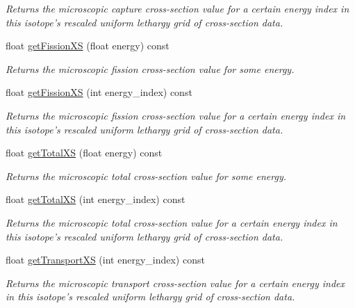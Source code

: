 \begin{DoxyCompactItemize}
\begin{DoxyCompactList}\small\item\em Returns the microscopic capture cross-\/section value for a certain energy index in this isotope's rescaled uniform lethargy grid of cross-\/section data. \end{DoxyCompactList}\item 
float \hyperlink{classIsotope_a1c49f7a0750425e6e6641bcd359e683f}{get\-Fission\-X\-S} (float energy) const 
\begin{DoxyCompactList}\small\item\em Returns the microscopic fission cross-\/section value for some energy. \end{DoxyCompactList}\item 
float \hyperlink{classIsotope_a298df112e3d2cd334071daaac0a63a6d}{get\-Fission\-X\-S} (int energy\-\_\-index) const 
\begin{DoxyCompactList}\small\item\em Returns the microscopic fission cross-\/section value for a certain energy index in this isotope's rescaled uniform lethargy grid of cross-\/section data. \end{DoxyCompactList}\item 
float \hyperlink{classIsotope_a087d27ba2f0d93114c9847315f408c40}{get\-Total\-X\-S} (float energy) const 
\begin{DoxyCompactList}\small\item\em Returns the microscopic total cross-\/section value for some energy. \end{DoxyCompactList}\item 
float \hyperlink{classIsotope_a2011a11b493809ee71315cfcb10ce54e}{get\-Total\-X\-S} (int energy\-\_\-index) const 
\begin{DoxyCompactList}\small\item\em Returns the microscopic total cross-\/section value for a certain energy index in this isotope's rescaled uniform lethargy grid of cross-\/section data. \end{DoxyCompactList}\item 
float \hyperlink{classIsotope_a7108414f5f312b4dd4373faf7edeb01e}{get\-Transport\-X\-S} (int energy\-\_\-index) const 
\begin{DoxyCompactList}\small\item\em Returns the microscopic transport cross-\/section value for a certain energy index in this isotope's rescaled uniform lethargy grid of cross-\/section data. \end{DoxyCompactList}\item 

\end{DoxyCompactItemize}
